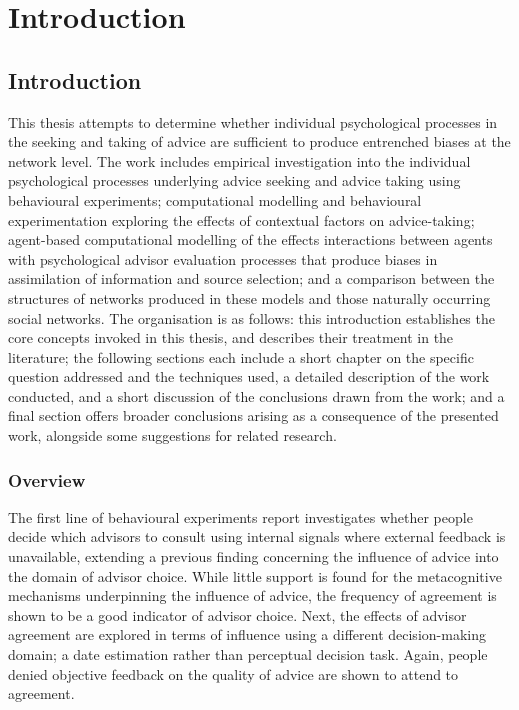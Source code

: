 \documentclass[a4paper, nobind]{templates/ociamthesis}
\begin{document}
\hypertarget{part-introduction}{%
\part{Introduction}\label{part-introduction}}

\hypertarget{chapter-introduction}{%
\chapter{Introduction}\label{chapter-introduction}}

\adjustmtc

This thesis attempts to determine whether individual psychological processes in the seeking and taking of advice are sufficient to produce entrenched biases at the network level. The work includes empirical investigation into the individual psychological processes underlying advice seeking and advice taking using behavioural experiments; computational modelling and behavioural experimentation exploring the effects of contextual factors on advice-taking; agent-based computational modelling of the effects interactions between agents with psychological advisor evaluation processes that produce biases in assimilation of information and source selection; and a comparison between the structures of networks produced in these models and those naturally occurring social networks. The organisation is as follows: this introduction establishes the core concepts invoked in this thesis, and describes their treatment in the literature; the following sections each include a short chapter on the specific question addressed and the techniques used, a detailed description of the work conducted, and a short discussion of the conclusions drawn from the work; and a final section offers broader conclusions arising as a consequence of the presented work, alongside some suggestions for related research.

\hypertarget{overview}{%
\section*{Overview}\label{overview}}

The first line of behavioural experiments report investigates whether people decide which advisors to consult using internal signals where external feedback is unavailable, extending a previous finding concerning the influence of advice \autocite{pescetelliRoleDecisionConfidence2018} into the domain of advisor choice. While little support is found for the metacognitive mechanisms underpinning the influence of advice, the frequency of agreement is shown to be a good indicator of advisor choice. Next, the effects of advisor agreement are explored in terms of influence using a different decision-making domain; a date estimation rather than perceptual decision task. Again, people denied objective feedback on the quality of advice are shown to attend to agreement.
\end{document}
